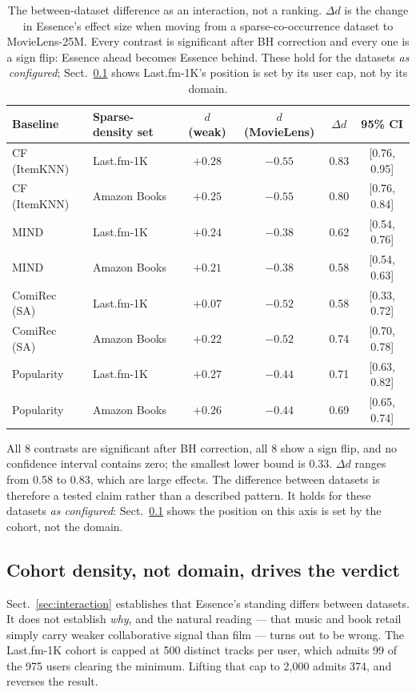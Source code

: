 \documentclass[runningheads,a4paper]{llncs}
\begin{document}
\begin{table}[tb]
\caption{The between-dataset difference as an interaction, not a ranking. $\Delta d$ is the
change in Essence's effect size when moving from a sparse-co-occurrence dataset to
MovieLens-25M. Every contrast is significant after BH correction and every one is a sign
flip: Essence ahead becomes Essence behind. These hold for the datasets \emph{as
configured}; Sect.~\ref{sec:cohort} shows Last.fm-1K's position is set by its user cap, not
by its domain.}\label{tab:interaction}
\centering
\footnotesize
\begin{tabular}{@{}llcccc@{}}
\toprule
Baseline & Sparse-density set & $d$ (weak) & $d$ (MovieLens) & $\Delta d$ & 95\% CI \\
\midrule
CF (ItemKNN) & Last.fm-1K & $+0.28$ & $-0.55$ & 0.83 & [0.76, 0.95] \\
CF (ItemKNN) & Amazon Books & $+0.25$ & $-0.55$ & 0.80 & [0.76, 0.84] \\
MIND & Last.fm-1K & $+0.24$ & $-0.38$ & 0.62 & [0.54, 0.76] \\
MIND & Amazon Books & $+0.21$ & $-0.38$ & 0.58 & [0.54, 0.63] \\
ComiRec (SA) & Last.fm-1K & $+0.07$ & $-0.52$ & 0.58 & [0.33, 0.72] \\
ComiRec (SA) & Amazon Books & $+0.22$ & $-0.52$ & 0.74 & [0.70, 0.78] \\
Popularity & Last.fm-1K & $+0.27$ & $-0.44$ & 0.71 & [0.63, 0.82] \\
Popularity & Amazon Books & $+0.26$ & $-0.44$ & 0.69 & [0.65, 0.74] \\
\bottomrule
\end{tabular}
\end{table}

All 8 contrasts are significant after BH correction, all 8 show a sign flip, and no
confidence interval contains zero; the smallest lower bound is 0.33. $\Delta d$ ranges
from 0.58 to 0.83, which are large effects. The difference between datasets is therefore a tested claim rather than a described
pattern. It holds for these datasets \emph{as configured}: Sect.~\ref{sec:cohort} shows
the position on this axis is set by the cohort, not the domain.

\subsection{Cohort density, not domain, drives the verdict}\label{sec:cohort}

Sect.~\ref{sec:interaction} establishes that Essence's standing differs between datasets.
It does not establish \emph{why}, and the natural reading --- that music and book retail
simply carry weaker collaborative signal than film --- turns out to be wrong. The Last.fm-1K
cohort is capped at 500 distinct tracks per user, which admits 99 of the 975 users clearing
the minimum. Lifting that cap to 2{,}000 admits 374, and reverses the result.
\end{document}
